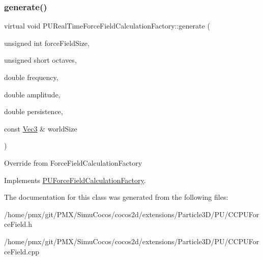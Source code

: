 \subsubsection{\texorpdfstring{generate()}{generate()}\hspace{0.1cm}{\footnotesize\ttfamily [2/2]}}
{\footnotesize\ttfamily virtual void P\+U\+Real\+Time\+Force\+Field\+Calculation\+Factory\+::generate (\begin{DoxyParamCaption}\item[{unsigned int}]{force\+Field\+Size,  }\item[{unsigned short}]{octaves,  }\item[{double}]{frequency,  }\item[{double}]{amplitude,  }\item[{double}]{persistence,  }\item[{const \hyperlink{classVec3}{Vec3} \&}]{world\+Size }\end{DoxyParamCaption})\hspace{0.3cm}{\ttfamily [virtual]}}

Override from Force\+Field\+Calculation\+Factory 

Implements \hyperlink{classPUForceFieldCalculationFactory_a8292a8ec09320a66c6ef130e98a7fd90}{P\+U\+Force\+Field\+Calculation\+Factory}.



The documentation for this class was generated from the following files\+:\begin{DoxyCompactItemize}
\item 
/home/pmx/git/\+P\+M\+X/\+Simu\+Cocos/cocos2d/extensions/\+Particle3\+D/\+P\+U/C\+C\+P\+U\+Force\+Field.\+h\item 
/home/pmx/git/\+P\+M\+X/\+Simu\+Cocos/cocos2d/extensions/\+Particle3\+D/\+P\+U/C\+C\+P\+U\+Force\+Field.\+cpp\end{DoxyCompactItemize}
